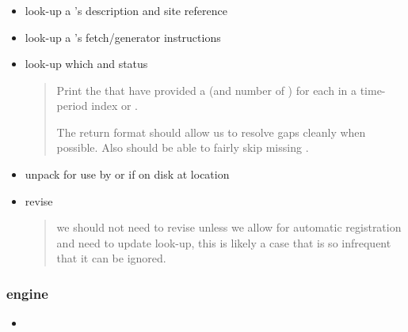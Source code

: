 \documentclass[11pt]{article} %
\newenvironment{slimlist}{
  \begin{itemize}
    \setlength{\topsep}{0pt}
    \setlength{\itemsep}{1pt}
    \setlength{\parsep}{0pt}
    \setlength{\parskip}{0pt}
}{\end{itemize}}
\newenvironment{mitemize}[1]{
  \begin{minipage}{\linewidth}
  \subsubsection*{#1}
  \begin{slimlist}
    \def\dfn{\item[def{\bf:}]}
}{\end{slimlist}\end{minipage}}
\begin{document}
\begin{mitemize}{\cp}
\item look-up a \cp's description and site reference
\item look-up a \ds's fetch/generator instructions
\item look-up which \ins and \ds status 
  \begin{quote}
    Print the  that have provided a \sol (and number of ) for each \ds in a time-period index or \ins .
    
    The return format should allow us to resolve gaps cleanly when possible. Also should be able to fairly skip missing .
  \end{quote}
\item unpack \ds for use by \ev or \sol if on disk at location

\item revise \ds
\begin{quote}
  we should not need to revise unless we allow for automatic registration and need to update look-up, this is likely a case that is so infrequent that it can be ignored. 
\end{quote}
\end{mitemize}

\begin{mitemize}{engine}
\item 
\end{mitemize}
\end{document}
